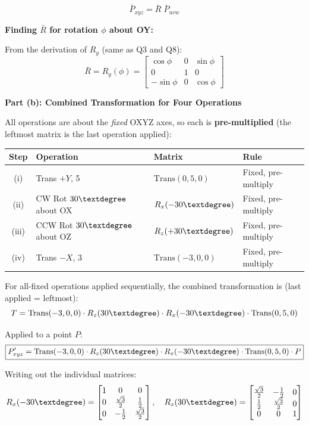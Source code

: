 \documentclass[12pt,a3paper]{article}
\begin{document}
\begin{enumerate}
\begin{tcolorbox}[enhanced,breakable,ansbox,colback=cB!4,colframe=cB,
  boxrule=0.8pt,arc=5pt,
  title={\textbf{Answer}},fonttitle=\bfseries\color{white},
  colbacktitle=cB]
\[
  \boxed{\bar{P}_{xyz} = \bar{R}\;\bar{P}_{uvw}}
\]

\textbf{Finding $\bar{R}$ for rotation $\phi$ about OY:}

From the derivation of $R_y$ (same as Q3 and Q8):
\[
  \bar{R} = R_y(\phi) =
  \begin{bmatrix}
    \cos\phi  & 0 & \sin\phi \\
    0         & 1 & 0        \\
   -\sin\phi  & 0 & \cos\phi
  \end{bmatrix}
\]

\medskip
\textbf{Part (b): Combined Transformation for Four Operations}

\medskip
All operations are about the \emph{fixed} OXYZ axes, so each is
\textbf{pre-multiplied} (the leftmost matrix is the last operation
applied):

\begin{center}
\small
\begin{tabular}{@{}clll@{}}
\toprule
\textbf{Step} & \textbf{Operation} & \textbf{Matrix} & \textbf{Rule}\\
\midrule
(i)  & Trans $+Y$, 5        & $\mathrm{Trans}(0,5,0)$  & Fixed, pre-multiply\\
(ii) & CW Rot $30\textdegree$ about OX & $R_x(-30\textdegree)$ & Fixed, pre-multiply\\
(iii)& CCW Rot $30\textdegree$ about OZ & $R_z(+30\textdegree)$ & Fixed, pre-multiply\\
(iv) & Trans $-X$, 3        & $\mathrm{Trans}(-3,0,0)$ & Fixed, pre-multiply\\
\bottomrule
\end{tabular}
\end{center}

For all-fixed operations applied sequentially, the combined
transformation is (last applied = leftmost):
\[
  T = \mathrm{Trans}(-3,0,0)\cdot R_z(30\textdegree)\cdot R_x(-30\textdegree)
    \cdot\mathrm{Trans}(0,5,0)
\]

Applied to a point $P$:
\[
  \boxed{P_{xyz}' = \mathrm{Trans}(-3,0,0)\cdot R_z(30\textdegree)\cdot R_x(-30\textdegree)\cdot\mathrm{Trans}(0,5,0)\cdot P}
\]

Writing out the individual matrices:
\[
  R_x(-30\textdegree) =
  \begin{bmatrix}1&0&0\\0&\frac{\sqrt{3}}{2}&\frac{1}{2}\\0&-\frac{1}{2}&\frac{\sqrt{3}}{2}\end{bmatrix},\quad
  R_z(30\textdegree) =
  \begin{bmatrix}\frac{\sqrt{3}}{2}&-\frac{1}{2}&0\\\frac{1}{2}&\frac{\sqrt{3}}{2}&0\\0&0&1\end{bmatrix}
\]


\end{tcolorbox}
\end{enumerate}
\end{document}
